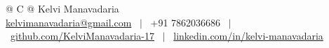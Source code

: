 \documentclass[a4paper,10.999999pt]{article}
\begin{document}
    
    \pagestyle{empty}
    
    
    
    \begin{tabularx}{\linewidth}{@{} C @{}}
    \LARGE{Kelvi Manavadaria} \\[4pt]
    \href{mailto:kelvimanavadaria@gmail.com}{kelvimanavadaria@gmail.com} \ $|$ \ 
    +91 7862036686 \ $|$ \ 
    \href{https://github.com/KelviManavadaria-17}{github.com/KelviManavadaria-17} \ $|$ \ 
    \href{https://www.linkedin.com/in/kelvi-manavadaria/}{linkedin.com/in/kelvi-manavadaria}
    \end{tabularx}
    
    
\end{document}

